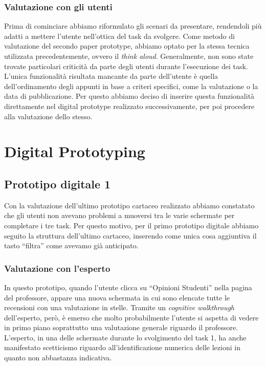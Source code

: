\subsubsection{Valutazione con gli utenti}
Prima di cominciare abbiamo riformulato gli scenari da presentare, rendendoli più adatti a mettere l'utente nell'ottica del task da svolgere.
Come metodo di valutazione del secondo paper prototype, abbiamo optato per la stessa tecnica utilizzata precedentemente, ovvero il \textit{think aloud}. Generalmente, non
sono state trovate particolari criticità da parte degli utenti durante l’esecuzione dei task. L’unica funzionalità risultata mancante da parte dell’utente è quella
dell’ordinamento degli appunti in base a criteri specifici, come la valutazione o la data di pubblicazione. Per questo
abbiamo deciso di inserire questa funzionalità direttamente nel digital prototype realizzato successivamente, per poi procedere alla valutazione dello stesso.

\section{Digital Prototyping}

\subsection{Prototipo digitale 1}
Con la valutazione dell'ultimo prototipo cartaceo realizzato abbiamo constatato che gli utenti non avevano problemi a muoversi tra le varie schermate per completare i tre task. Per questo motivo, per il
primo prototipo digitale abbiamo seguito la struttura dell’ultimo cartaceo, inserendo come unica cosa aggiuntiva il tasto “filtra” come avevamo già anticipato.

\subsubsection{Valutazione con l'esperto}
In questo prototipo, quando l’utente clicca su “Opinioni Studenti” nella pagina del professore, appare una nuova schermata in cui sono elencate tutte le recensioni con una valutazione in stelle.
Tramite un \textit{cognitive walkthrough} dell’esperto, però, è emerso che molto probabilmente l’utente si aspetta di vedere in primo piano soprattutto una valutazione generale riguardo il professore.
L’esperto, in una delle schermate durante lo svolgimento del task 1, ha anche manifestato scetticismo riguardo all’identificazione numerica delle lezioni in quanto non abbastanza indicativa.

